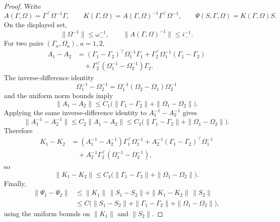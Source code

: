 \documentclass[11pt,a4paper]{amsart}
\theoremstyle{plain}
\theoremstyle{definition}
\theoremstyle{remark}
\begin{document}
\begin{proof}
Write
\[
        A(\Gamma,\Omega)=\Gamma^\top\Omega^{-1}\Gamma,
        \qquad
        K(\Gamma,\Omega)=A(\Gamma,\Omega)^{-1}\Gamma^\top\Omega^{-1},
        \qquad
        \Psi(S,\Gamma,\Omega)=K(\Gamma,\Omega)S.
\]
On the displayed set,
\[
        \|\Omega^{-1}\|\le \omega_-^{-1},
        \qquad
        \|A(\Gamma,\Omega)^{-1}\|\le i_-^{-1}.
\]
For two pairs \((\Gamma_a,\Omega_a)\), \(a=1,2\),
\[
\begin{aligned}
        A_1-A_2
        &=
        (\Gamma_1-\Gamma_2)^\top\Omega_1^{-1}\Gamma_1
        +
        \Gamma_2^\top\Omega_1^{-1}(\Gamma_1-\Gamma_2) \\
        &\quad+
        \Gamma_2^\top(\Omega_1^{-1}-\Omega_2^{-1})\Gamma_2 .
\end{aligned}
\]
The inverse-difference identity
\[
        \Omega_1^{-1}-\Omega_2^{-1}
        =
        \Omega_1^{-1}(\Omega_2-\Omega_1)\Omega_2^{-1}
\]
and the uniform norm bounds imply
\[
        \|A_1-A_2\|
        \le
        C_1\bigl(\|\Gamma_1-\Gamma_2\|+\|\Omega_1-\Omega_2\|\bigr).
\]
Applying the same inverse-difference identity to \(A_1^{-1}-A_2^{-1}\) gives
\[
        \|A_1^{-1}-A_2^{-1}\|
        \le
        C_2\|A_1-A_2\|
        \le
        C_3\bigl(\|\Gamma_1-\Gamma_2\|+\|\Omega_1-\Omega_2\|\bigr).
\]
Therefore
\[
\begin{aligned}
        K_1-K_2
        &=
        (A_1^{-1}-A_2^{-1})\Gamma_1^\top\Omega_1^{-1}
        +
        A_2^{-1}(\Gamma_1-\Gamma_2)^\top\Omega_1^{-1} \\
        &\quad+
        A_2^{-1}\Gamma_2^\top(\Omega_1^{-1}-\Omega_2^{-1}),
\end{aligned}
\]
so
\[
        \|K_1-K_2\|
        \le
        C_4\bigl(\|\Gamma_1-\Gamma_2\|+\|\Omega_1-\Omega_2\|\bigr).
\]
Finally,
\[
\begin{aligned}
        \|\Psi_1-\Psi_2\|
        &\le
        \|K_1\|\,\|S_1-S_2\|+\|K_1-K_2\|\,\|S_2\| \\
        &\le
        C\bigl(
        \|S_1-S_2\|
        +
        \|\Gamma_1-\Gamma_2\|
        +
        \|\Omega_1-\Omega_2\|
        \bigr),
\end{aligned}
\]
using the uniform bounds on \(\|K_1\|\) and \(\|S_2\|\).
\end{proof}
\end{document}
